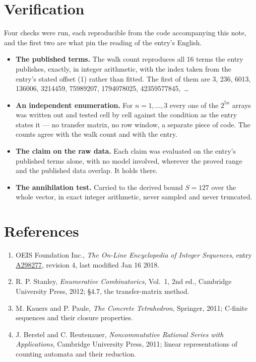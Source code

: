 \documentclass[11pt]{article}
\theoremstyle{definition}
\begin{document}
\section{Verification}

Four checks were run, each reproducible from the code accompanying this note, and the first two are what pin the reading of the entry's English.

\begin{itemize}

\item {\bfseries The published terms.} The walk count reproduces all 16 terms the entry publishes, exactly, in integer arithmetic, with the index taken from the entry's stated offset (1) rather than fitted. The first of them are 3, 236, 6013, 136006, 3214459, 75989207, 1794078025, 42359577845,~\dots

\item {\bfseries An independent enumeration.} For $n = 1,\dots,3$ every one of the $2^{5n}$ arrays was written out and tested cell by cell against the condition as the entry states it --- no transfer matrix, no row window, a separate piece of code. The counts agree with the walk count and with the entry.

\item {\bfseries The claim on the raw data.} Each claim was evaluated on the entry's published terms alone, with no model involved, wherever the proved range and the published data overlap. It holds there.

\item {\bfseries The annihilation test.} Carried to the derived bound $S = 127$ over the whole vector, in exact integer arithmetic, never sampled and never truncated.

\end{itemize}

\section{References}

\begin{enumerate}

\item OEIS Foundation Inc., \emph{The On-Line Encyclopedia of Integer Sequences}, entry \href{https://oeis.org/A298277}{A298277}, revision 4, last modified Jan 16 2018.

\item R. P. Stanley, \emph{Enumerative Combinatorics}, Vol.~1, 2nd ed., Cambridge University Press, 2012; \S4.7, the transfer-matrix method.

\item M. Kauers and P. Paule, \emph{The Concrete Tetrahedron}, Springer, 2011; C-finite sequences and their closure properties.

\item J. Berstel and C. Reutenauer, \emph{Noncommutative Rational Series with Applications}, Cambridge University Press, 2011; linear representations of counting automata and their reduction.

\end{enumerate}
\end{document}
